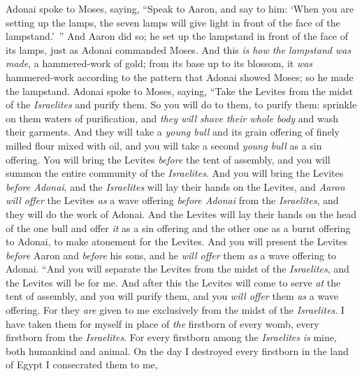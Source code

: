\begin{biblechapter} %
 Adonai spoke to Moses, saying,
\verse “Speak to Aaron, and say to him: ‘When you are setting up the lamps, the seven lamps will give light in front of the face of the lampstand.’ ”
\verse And Aaron did so; he set up the lampstand in front of the face of its lamps, just as Adonai commanded Moses.
\verse And this \textit{is} \textit{how the lampstand was made}, a hammered-work of gold; from its base up to its blossom, it \textit{was} hammered-work according to the pattern that Adonai showed Moses; so he made the lampstand.
 Adonai spoke to Moses, saying,
\verse “Take the Levites from the midst of the \textit{Israelites} and purify them.
\verse So you will do to them, to purify them: sprinkle on them waters of purification, and \textit{they will shave their whole body} and wash their garments.
\verse And they will take a \textit{young bull} and its grain offering of finely milled flour mixed with oil, and you will take a second \textit{young bull} as a sin offering.
\verse You will bring the Levites \textit{before} the tent of assembly, and you will summon the entire community of the \textit{Israelites}.
\verse And you will bring the Levites \textit{before Adonai}, and the \textit{Israelites} will lay their hands on the Levites,
\verse and \textit{Aaron will offer} the Levites \textit{as} a wave offering \textit{before Adonai} from the \textit{Israelites}, and they will do the work of Adonai.
\verse And the Levites will lay their hands on the head of the one bull and offer \textit{it} as a sin offering and the other one as a burnt offering to Adonai, to make atonement for the Levites.
\verse And you will present the Levites \textit{before} Aaron and \textit{before} his sons, and he \textit{will offer} them \textit{as} a wave offering to Adonai.
\verse “And you will separate the Levites from the midst of the \textit{Israelites}, and the Levites will be for me.
\verse And after this the Levites will come to serve \textit{at} the tent of assembly, and you will purify them, and you \textit{will offer} them \textit{as} a wave offering.
\verse For they \textit{are} given to me exclusively from the midst of the \textit{Israelites}. I have taken them for myself in place of \textit{the} firstborn of every womb, every firstborn from the \textit{Israelites}.
\verse For every firstborn among the \textit{Israelites} \textit{is} mine, both humankind and animal. On the day I destroyed every firstborn in the land of Egypt I consecrated them to me,

\end{biblechapter}
